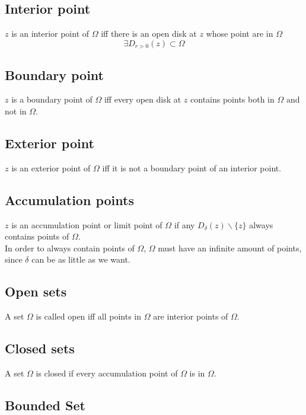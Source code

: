 \documentclass{article}
\begin{document}
\subsection{Interior point}

\(z\) is an interior point of \(\Omega\) iff there is an open disk
at \(z\) whose point are in \(\Omega\)
\[
    \exists D_{r>0}(z) \subset \Omega
\]

\subsection{Boundary point}

\(z\) is a boundary point of \(\Omega\) iff every open disk at \(z\)
contains points both in \(\Omega\) and not in \(\Omega\).

\subsection{Exterior point}

\(z\) is an exterior point of \(\Omega\) iff it is not a boundary
point of an interior point.

\subsection{Accumulation points}

\(z\) is an accumulation point or limit point of \(\Omega\) if any
\(D_\delta(z)\backslash \{z\}\) always contains points of \(\Omega\).
\\
In order to always contain points of \(\Omega\), \(\Omega\) must have an
infinite amount of points, since \(\delta\) can be as little as we want.

\subsection{Open sets}

A set \(\Omega\) is called open iff all points in \(\Omega\)
are interior points of \(\Omega\).

\subsection{Closed sets}

A set \(\Omega\) is closed if every accumulation point of \(\Omega\)
is in \(\Omega\). 

\subsection{Bounded Set}
\end{document}
